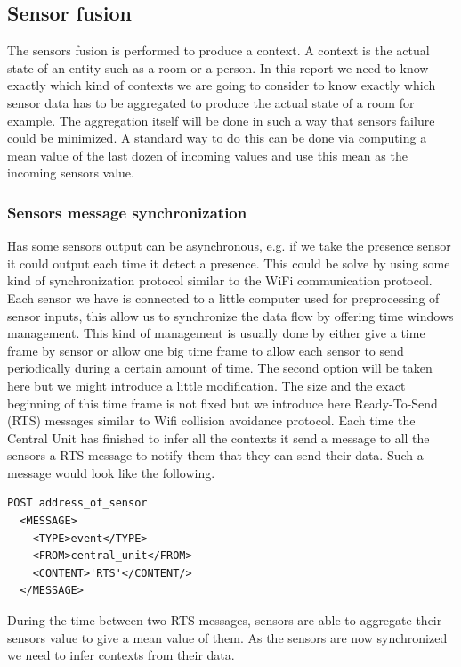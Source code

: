 \documentclass{acm_proc_article-sp}
\begin{document}
\subsection{Sensor fusion}
The sensors fusion is performed to produce a context. A context is the actual state of an entity such as a room or a person. 
In this report we need to know exactly which kind of contexts we are going to consider to know exactly which sensor data has to be aggregated to produce the actual state of a room for example. 
The aggregation itself will be done in such a way that sensors failure could be minimized.
A standard way to do this can be done via computing a mean value of the last dozen of incoming values and use this mean as the incoming sensors value.
\subsubsection{Sensors message synchronization}
Has some sensors output can be asynchronous, e.g. if we take the presence sensor it could output each time it detect a presence.
This could be solve by using some kind of synchronization protocol similar to the WiFi communication protocol.
Each sensor we have is connected to a little computer used for preprocessing of sensor inputs, this allow us to synchronize the data flow by offering time windows management.
This kind of management is usually done by either give a time frame by sensor or allow one big time frame to allow each sensor to send periodically during a certain amount of time.
The second option will be taken here but we might introduce a little modification. 
The size and the exact beginning of this time frame is not fixed but we introduce here Ready-To-Send (RTS) messages similar to Wifi collision avoidance protocol.
Each time the Central Unit has finished to infer all the contexts it send a message to all the sensors a RTS message to notify them that they can send their data.
Such a message would look like the following.
\begin{verbatim}
POST address_of_sensor 
  <MESSAGE>
    <TYPE>event</TYPE>
    <FROM>central_unit</FROM>
    <CONTENT>'RTS'</CONTENT/>
  </MESSAGE> 
\end{verbatim}
During the time between two RTS messages, sensors are able to aggregate their sensors value to give a mean value of them.
As the sensors are now synchronized we need to infer contexts from their data.
\end{document}
